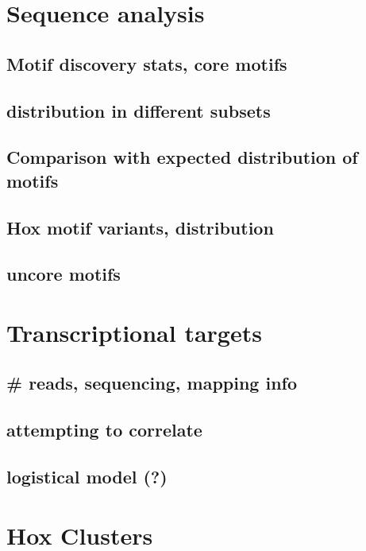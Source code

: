 \section{Sequence analysis}

\subsection{Motif discovery stats, core motifs}

\subsection{distribution in different subsets}

\subsection{Comparison with expected distribution of motifs}

\subsection{Hox motif variants, distribution}

\subsection{uncore motifs}

\section{Transcriptional targets}

\subsection{\# reads, sequencing, mapping info}

\subsection{attempting to correlate}

\subsection{logistical model (?)}

\section{Hox Clusters}

